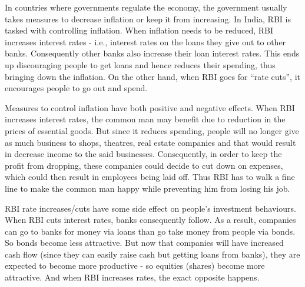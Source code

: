 In countries where governments regulate the economy, the government usually takes measures to decrease inflation or keep it from increasing.  In India, RBI is tasked with controlling inflation. When inflation needs to be reduced, RBI increases interest rates - i.e., interest rates on the loans they give out to other banks. Consequently other banks also increase their loan interest rates. This ends up discouraging people to get loans and hence reduces their spending, thus bringing down the inflation. On the other hand, when RBI goes for ``rate cuts'', it encourages people to go out and spend. 

Measures to control inflation have both positive and negative effects. When RBI increases interest rates, the common man may benefit due to reduction in the prices of essential goods. But since it reduces spending, people will no longer give as much business to shops, theatres, real estate companies and that would result in decrease income to the said businesses. Consequently, in order to keep the profit from dropping, these companies could decide to cut down on expenses, which could then result in employees being laid off. Thus RBI has to walk a fine line to make the common man happy while preventing him from losing his job.

RBI rate increases/cuts have some side effect on people's investment behaviours. When RBI cuts interest rates, banks consequently follow. As a result, companies can go to banks for money via loans than go take money from people via bonds. So bonds become less attractive. But now that companies will have increased cash flow (since they can easily raise cash but getting loans from banks), they are expected to become more productive - so equities (shares) become more attractive. And when RBI increases rates, the exact opposite happens. 


